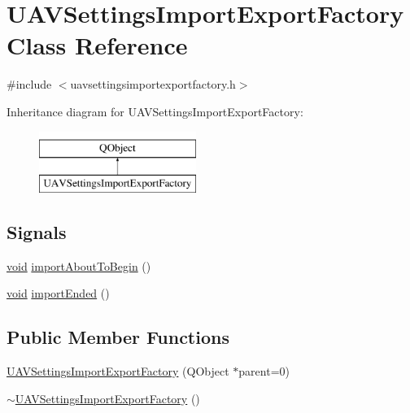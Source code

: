 \hypertarget{class_u_a_v_settings_import_export_factory}{\section{U\-A\-V\-Settings\-Import\-Export\-Factory Class Reference}
\label{class_u_a_v_settings_import_export_factory}
}


{\ttfamily \#include $<$uavsettingsimportexportfactory.\-h$>$}

Inheritance diagram for U\-A\-V\-Settings\-Import\-Export\-Factory\-:\begin{figure}[H]
\begin{center}
\leavevmode
\includegraphics[height=2.000000cm]{class_u_a_v_settings_import_export_factory}
\end{center}
\end{figure}
\subsection*{Signals}
\begin{DoxyCompactItemize}
\item 
\hyperlink{group___u_a_v_objects_plugin_ga444cf2ff3f0ecbe028adce838d373f5c}{void} \hyperlink{group___u_a_v_settings_import_export_ga1d7a913adac9094e20d9086a8a1cb5c3}{import\-About\-To\-Begin} ()
\item 
\hyperlink{group___u_a_v_objects_plugin_ga444cf2ff3f0ecbe028adce838d373f5c}{void} \hyperlink{group___u_a_v_settings_import_export_ga456326e359badf7b245abf501d9a6006}{import\-Ended} ()
\end{DoxyCompactItemize}
\subsection*{Public Member Functions}
\begin{DoxyCompactItemize}
\item 
\hyperlink{group___u_a_v_settings_import_export_ga487d479be4ae96eddde7372c94c27bd7}{U\-A\-V\-Settings\-Import\-Export\-Factory} (Q\-Object $\ast$parent=0)
\item 
\hyperlink{group___u_a_v_settings_import_export_gac83bc105170e6ccdb6e39818edd45b57}{$\sim$\-U\-A\-V\-Settings\-Import\-Export\-Factory} ()
\end{DoxyCompactItemize}


